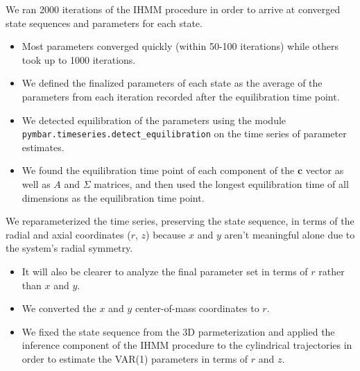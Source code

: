 \documentclass{article}
\begin{document}
  We ran 2000 iterations of the IHMM procedure in order to arrive at converged 
  state sequences and parameters for each state.
  \begin{itemize}  
   \item Most parameters converged quickly (within 50-100 iterations) while
    others took up to 1000 iterations.
    \item We defined the finalized parameters of each state as the average
    of the parameters from each iteration recorded after the equilibration 
    time point.
    \item We detected equilibration of the parameters using the module 
    \texttt{pymbar.timeseries.detect\_equilibration} on the time series of 
    parameter estimates. 
    \item We found the equilibration time point of each component of the 
    $\mathbf{c}$ vector as well as $A$ and $\Sigma$ matrices, and then used the longest
    equilibration time of all dimensions as the equilibration time point.
  \end{itemize}
  
  We reparameterized the time series, preserving the state sequence, in terms
  of the radial and axial coordinates ($r$, $z$) because $x$ and $y$ aren't 
  meaningful alone due to the system's radial symmetry.
  \begin{itemize}
    \item It will also be clearer to analyze the final parameter set in
    terms of $r$ rather than $x$ and $y$.
    \item We converted the $x$ and $y$ center-of-mass coordinates to $r$.
    \item We fixed the state sequence from the 3D parmeterization and applied the
    inference component of the IHMM procedure to the cylindrical trajectories in
    order to estimate the VAR(1) parameters in terms of $r$ and $z$.
  \end{itemize} 
  
\end{document}
